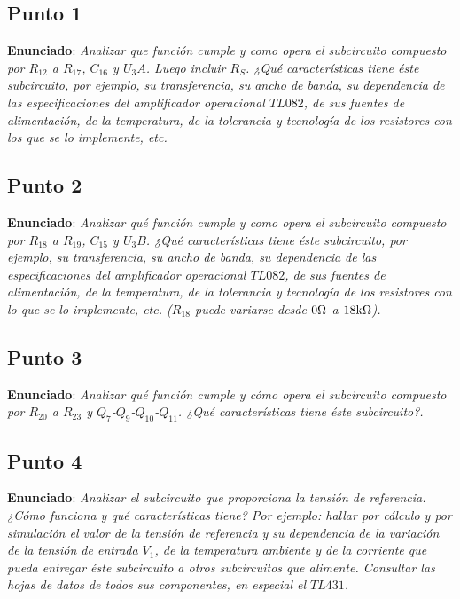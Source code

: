 
\subsection{Punto 1}

\textbf{Enunciado}: \textsl{Analizar que función cumple y como opera el subcircuito compuesto por $R_{12}$ a $R_{17}$, $C_{16}$ y $U_{3}A$. Luego incluir $R_{S}$. ¿Qué características tiene éste subcircuito, por ejemplo, su transferencia, su ancho de banda, su dependencia de las especificaciones del amplificador operacional $TL082$, de sus fuentes de alimentación, de la temperatura, de la tolerancia y tecnología de los resistores con los que se lo implemente, etc.}



\subsection{Punto 2}

\textbf{Enunciado}: \textsl{Analizar qué función cumple y como opera el subcircuito compuesto por $R_{18}$ a $R_{19}$, $C_{15}$ y $U_{3}B$. ¿Qué características tiene éste subcircuito, por ejemplo, su transferencia, su ancho de banda, su dependencia de las especificaciones del amplificador operacional $TL082$, de sus fuentes de alimentación, de la temperatura, de la tolerancia y tecnología de los resistores con lo que se lo implemente, etc. ($R_{18}$ puede variarse desde $0 \si[per-mode=symbol]{\ohm}$ a $18 \si[per-mode=symbol]{\kilo\ohm}$).}



\subsection{Punto 3}

\textbf{Enunciado}: \textsl{Analizar qué función cumple y cómo opera el subcircuito compuesto por $R_{20}$ a $R_{23}$ y $Q_{7}$-$Q_{9}$-$Q_{10}$-$Q_{11}$. ¿Qué características tiene éste subcircuito?.}



\subsection{Punto 4}

\textbf{Enunciado}: \textsl{Analizar el subcircuito que proporciona la tensión de referencia. ¿Cómo funciona y qué características tiene? Por ejemplo: hallar por cálculo y por simulación el valor de la tensión de referencia y su dependencia de la variación de la tensión de entrada $V_{1}$, de la temperatura ambiente y de la corriente que pueda entregar éste subcircuito a otros subcircuitos que alimente. Consultar las hojas de datos de todos sus componentes, en especial el $TL431$.}

